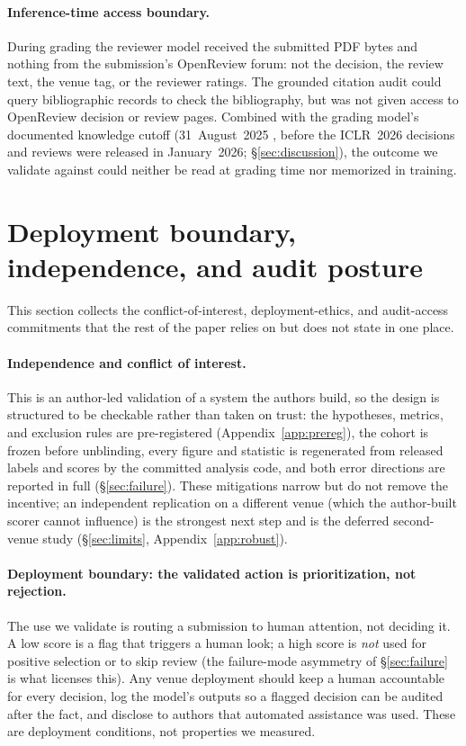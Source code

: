\paragraph{Inference-time access boundary.} During grading the reviewer model
received the submitted PDF bytes and nothing from the submission's OpenReview
forum: not the decision, the review text, the venue tag, or the reviewer ratings.
The grounded citation audit could query bibliographic records to check the
bibliography, but was not given access to OpenReview decision or review pages.
Combined with the grading model's documented knowledge cutoff
(31~August~2025 \citep{openai2026gpt54}, before the ICLR~2026 decisions and
reviews were released in January~2026; \S\ref{sec:discussion}), the outcome we
validate against could neither be read at grading time nor memorized in training.

\section{Deployment boundary, independence, and audit posture}
\label{app:posture}
This section collects the conflict-of-interest, deployment-ethics, and
audit-access commitments that the rest of the paper relies on but does not state
in one place.

\paragraph{Independence and conflict of interest.} This is an author-led
validation of a system the authors build, so the design is structured to be
checkable rather than taken on trust: the hypotheses, metrics, and exclusion
rules are pre-registered (Appendix~\ref{app:prereg}), the cohort is frozen before
unblinding, every figure and statistic is regenerated from released labels and
scores by the committed analysis code, and both error directions are reported in
full (\S\ref{sec:failure}). These mitigations narrow but do not remove the
incentive; an independent replication on a different venue (which the
author-built scorer cannot influence) is the strongest next step and is the
deferred second-venue study (\S\ref{sec:limits}, Appendix~\ref{app:robust}).

\paragraph{Deployment boundary: the validated action is prioritization, not
rejection.} The use we validate is routing a submission to human attention, not
deciding it. A low score is a flag that triggers a human look; a high score is
\emph{not} used for positive selection or to skip review (the failure-mode
asymmetry of \S\ref{sec:failure} is what licenses this). Any venue deployment
should keep a human accountable for every decision, log the model's outputs so a
flagged decision can be audited after the fact, and disclose to authors that
automated assistance was used. These are deployment conditions, not properties we
measured.

